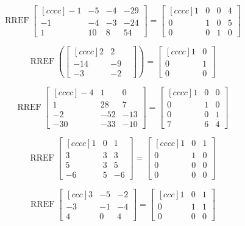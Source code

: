 \documentclass{article}
\DeclareMathOperator{\RREF}{RREF}
\begin{document}
 \[\RREF
\begin{bmatrix}[cccc]
-1 & -5 & -4 & -29 \\
-1 & -4 & -3 & -24 \\
1 & 10 & 8 & 54
\end{bmatrix}=
\begin{bmatrix}[cccc]
1 & 0 & 0 & 4 \\
0 & 1 & 0 & 5 \\
0 & 0 & 1 & 0
\end{bmatrix}
\]

$$\RREF(\begin{bmatrix}[cccc]
2 & 2 &  \\
-14 & -9  \\
-3 & -2 
\end{bmatrix})=\begin{bmatrix}[cccc]
1 & 0  \\
0 & 1  \\
0 & 0 
\end{bmatrix}$$

\[\RREF
\begin{bmatrix}[cccc]
-4 &1 & 0 \\
1 &28 & 7\\
-2 &-52 &-13 \\
-30 & -33 &-10
\end{bmatrix}=
\begin{bmatrix}[cccc]
1 & 0 & 0\\
0 & 1 & 0 \\
0 & 0 & 1\\
7 & 6 &4
\end{bmatrix}
\]

$$\RREF \begin{bmatrix}[cccc]
1 & 0 & 1  \\
3 & 3 & 3 \\
5 & 3 &5 \\
-6 & 5 & -6
\end{bmatrix}=\begin{bmatrix}[cccc]
1 & 0 & 1  \\
0 & 1 & 0 \\
0 & 0 &0 \\
0 & 0 & 0
\end{bmatrix} $$

 \[\RREF
\begin{bmatrix}[ccc]
3 & -5 & -2 \\
-3 & -1 & -4\\
4 & 0 & 4 
\end{bmatrix} 
= \begin{bmatrix}[ccc]
1 & 0 &1  \\
0 & 1 & 1  \\
0 & 0 & 0 
\end{bmatrix}
\]
\end{document}
